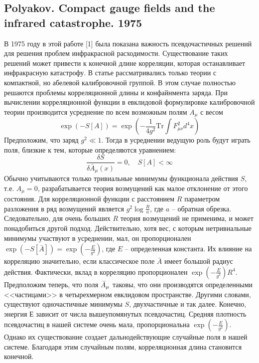 \documentclass[12pt]{article}
\theoremstyle{definition}
\begin{document}
\subsection{Polyakov. Compact gauge fields and the infrared catastrophe. 1975}
В 1975 году в этой работе [1] была показана важность псевдочастичных решений для решения проблем инфракрасной расходимости. Существование таких решений может привести к конечной длине корреляции, которая останавливает инфракрасную катастрофу. В статье рассматривались только теории с компактной, но абелевой калибровочной группой. В этом случае полностью решаются проблемы корреляционной длины и конфайнмента заряда. При вычислении корреляционной функции в евклидовой формулировке калибровочной теории производится усреднение по всем возможным полям $A_\mu$ с весом
\begin{equation}
    \exp(-S[A])=\exp\left(-\frac{1}{4g^2}\text{Tr}\int F_{\mu\nu}^2d^4x\right)
\end{equation}
Предположим, что заряд $g^2\ll1$. Тогда в усреднении ведущую роль будут играть поля, близкие к тем, которые определяются уравнением:
\begin{equation}
    \frac{\delta S}{\delta\bar{A}_\mu(x)}=0,\quad S[A]<\infty
\end{equation}
Обычно учитываются только тривиальные минимумы функционала действия $S$, т.е. $A_\mu = 0$, разрабатывается теория возмущений как малое отклонение от этого состояния. Для корреляционной функции с расстоянием $R$ параметром разложения в ряд возмущений является $g^2\log\frac{R}{a}$, где $a$ -- обратная обрезка. Следовательно, для очень больших $R$ теория возмущений не применима, и может понадобиться другой подход. Действительно, хотя вес, с которым нетривиальные минимумы участвуют в усреднении, мал, он пропорционален $\exp(-S[\bar{A}])=\exp\left(-\frac{E}{g^2}\right)$, где $E$ -- определенная константа. Их влияние на корреляцию значительно, если классическое поле $\bar{A}$ имеет большой радиус действия. Фактически, вклад в корреляцию пропорционален $\exp\left(-\frac{E}{g^2}\right)R^4$.\\
Предположим теперь, что поля $\Bar{A}_\mu$ таковы, что они производятся определенными <<частицами>> в четырехмерном евклидовом пространстве. Другими словами, существуют одночастичные минимумы $S$, двухчастичные и так далее. Конечно, энергия $Е$ зависит от числа вышеупомянутых псевдочастиц. Средняя плотность псевдочастиц в нашей системе очень мала, пропорциональна $\exp\left(-\frac{E}{g^2}\right)$. Однако их существование создает дальнодействующие случайные поля в нашей системе. Благодаря этим случайным полям, корреляционная длина становится конечной.\\
\end{document}
